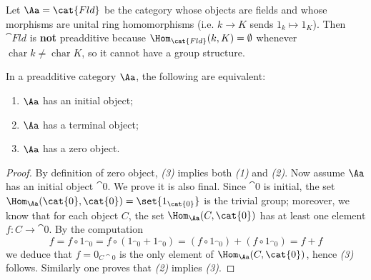 \begin{ex}
    Let $\Aa = \cat{Fld}$ be the category whose objects are fields and
    whose morphisms are unital ring homomorphisms 
    (i.e. $k \to K$ sends $1_{k} \mapsto 1_{K}$).
    Then $\cat{Fld}$ is \textbf{not} preadditive because
    $\Hom_{\cat{Fld}}(k,K) = \emptyset$ whenever 
    $\operatorname{char}k \ne \operatorname{char} K$,
    so it cannot have a group structure.
\end{ex}

\begin{prop}
    In a preadditive category $\Aa$, the following are equivalent:
    \begin{enumerate}
        \item $\Aa$ has an initial object;
        \item $\Aa$ has a terminal object;
        \item $\Aa$ has a zero object.
    \end{enumerate}
    \begin{proof}
        By definition of zero object, 
        \emph{(3)} implies both \emph{(1)} and \emph{(2)}.
        Now assume $\Aa$ has an initial object $\cat{0}$. 
        We prove it is also final. 
        Since $\cat{0}$ is initial, the set 
        $\Hom_{\Aa}(\cat{0}, \cat{0}) = \set{1_{\cat{0}}}$ is the trivial
        group; moreover, we know that for each object $C$,
        the set $\Hom_{\Aa}(C,\cat{0})$ has at least one element 
        $f : C \to \cat{0}$. By the computation
        \begin{equation*}
            f = f \circ 1_{\cat{0}} 
            = f \circ (1_{\cat{0}} + 1_{\cat{0}})
            = (f \circ 1_{\cat{0}}) + (f \circ 1_{\cat{0}})
            = f + f
        \end{equation*}
        we deduce that $f = 0_{C\cat{0}}$ is the only element
        of $\Hom_{\Aa}(C, \cat{0})$, hence \emph{(3)} follows.
        Similarly one proves that \emph{(2)} implies \emph{(3)}.
    \end{proof}
\end{prop} 

